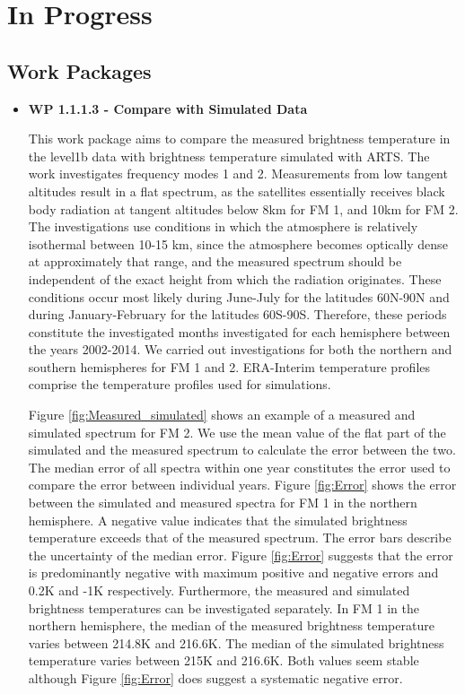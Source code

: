 \chapter{In Progress}
\label{chapter:in_progress}



\section{Work Packages}

\begin{itemize}

\item{\bf WP 1.1.1.3 - Compare with Simulated Data}

This work package aims to compare the measured brightness temperature in the level1b data with brightness temperature simulated with ARTS. The work investigates frequency modes 1 and 2. Measurements from low tangent altitudes result in a flat spectrum, as the satellites essentially receives black body radiation at tangent altitudes below 8km for FM 1, and 10km for FM 2. The investigations use conditions in which the atmosphere is relatively isothermal between 10-15 km, since the atmosphere becomes optically dense at approximately that range, and the measured spectrum should be independent of the exact height from which the radiation originates. These conditions occur most likely during June-July for the latitudes 60N-90N and during January-February for the latitudes 60S-90S. Therefore, these periods constitute the investigated months investigated for each hemisphere between the years 2002-2014. We carried out investigations for both the northern and southern hemispheres for FM 1 and 2. ERA-Interim temperature profiles comprise the temperature profiles used for simulations.

Figure \ref{fig:Measured_simulated} shows an example of a measured and simulated spectrum for FM 2. We use the mean value of the flat part of the simulated and the measured spectrum to calculate the error between the two. The median error of all spectra within one year constitutes the error used to compare the error between individual years. Figure \ref{fig:Error} shows the error between the simulated and measured spectra for FM 1 in the northern hemisphere. A negative value indicates that the simulated brightness temperature exceeds that of the measured spectrum. The error bars describe the uncertainty of the median error. Figure \ref{fig:Error} suggests that the error  is predominantly negative with maximum positive and negative errors and 0.2K and -1K respectively. Furthermore, the measured and simulated brightness temperatures can be investigated separately. In FM 1 in the northern hemisphere, the median of the measured brightness temperature varies between 214.8K and 216.6K. The median of the simulated brightness temperature varies between 215K and 216.6K. Both values seem stable although Figure \ref{fig:Error} does suggest a systematic negative error.


\end{itemize}
